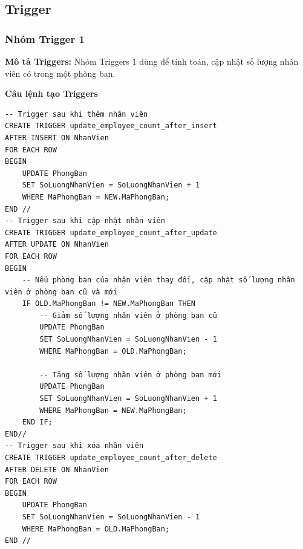 \subsection{Trigger}
\subsubsection{Nhóm Trigger 1}

\textbf{Mô tả Triggers:} Nhóm Triggers 1 dùng để tính toán, cập nhật số lượng nhân viên có trong một phòng ban.

\textbf{Câu lệnh tạo Triggers}
\begin{verbatim}
-- Trigger sau khi thêm nhân viên
CREATE TRIGGER update_employee_count_after_insert 
AFTER INSERT ON NhanVien
FOR EACH ROW
BEGIN
    UPDATE PhongBan 
    SET SoLuongNhanVien = SoLuongNhanVien + 1
    WHERE MaPhongBan = NEW.MaPhongBan;
END //
-- Trigger sau khi cập nhật nhân viên
CREATE TRIGGER update_employee_count_after_update
AFTER UPDATE ON NhanVien
FOR EACH ROW
BEGIN
    -- Nếu phòng ban của nhân viên thay đổi, cập nhật số lượng nhân viên ở phòng ban cũ và mới
    IF OLD.MaPhongBan != NEW.MaPhongBan THEN
        -- Giảm số lượng nhân viên ở phòng ban cũ
        UPDATE PhongBan
        SET SoLuongNhanVien = SoLuongNhanVien - 1
        WHERE MaPhongBan = OLD.MaPhongBan;
        
        -- Tăng số lượng nhân viên ở phòng ban mới
        UPDATE PhongBan
        SET SoLuongNhanVien = SoLuongNhanVien + 1
        WHERE MaPhongBan = NEW.MaPhongBan;
    END IF;
END//
-- Trigger sau khi xóa nhân viên
CREATE TRIGGER update_employee_count_after_delete
AFTER DELETE ON NhanVien
FOR EACH ROW
BEGIN
    UPDATE PhongBan 
    SET SoLuongNhanVien = SoLuongNhanVien - 1
    WHERE MaPhongBan = OLD.MaPhongBan;
END //
\end{verbatim}


